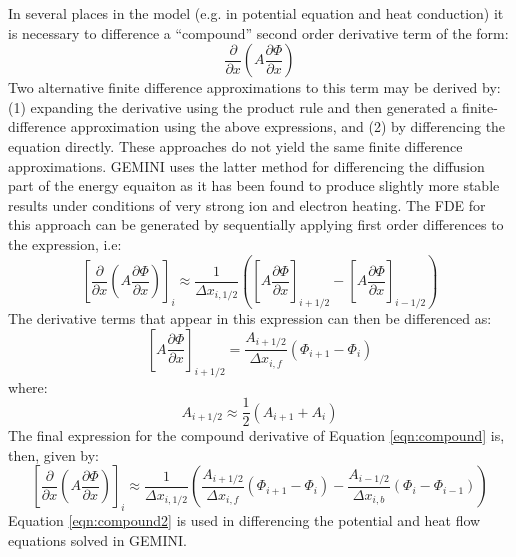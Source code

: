 \documentclass[11pt,letterpaper]{article}
\begin{document}
In several places in the model (e.g. in potential equation and heat conduction) it is necessary to difference a ``compound'' second order derivative term of the form:
\begin{equation}
\frac{\partial}{\partial x} \left( A \frac{\partial \Phi}{\partial x} \right) \label{eqn:compound}
\end{equation}
Two alternative finite difference approximations to this term may be derived by:  (1) expanding the derivative using the product rule and then generated a finite-difference approximation using the above expressions, and (2) by differencing the equation directly.  These approaches do not yield the same finite difference approximations.  GEMINI uses the latter method for differencing the diffusion part of the energy equaiton as it has been found to produce slightly more stable results under conditions of very strong ion and electron heating.  The FDE for this approach can be generated by sequentially applying first order differences to the expression, i.e:
\begin{equation}
\left[ \frac{\partial}{\partial x} \left( A \frac{\partial \Phi}{\partial x} \right) \right]_i \approx \frac{1}{\Delta x_{i,1/2}} \left( \left[ A \frac{\partial \Phi}{\partial x} \right]_{i+1/2} - \left[ A \frac{\partial \Phi}{\partial x} \right]_{i-1/2} \right)
\end{equation}
The derivative terms that appear in this expression can then be differenced as:
\begin{equation}
\left[ A \frac{\partial \Phi}{\partial x} \right]_{i+1/2} = \frac{A_{i+1/2}}{\Delta x_{i,f}} \left( \Phi_{i+1} - \Phi_{i} \right)
\end{equation}
where:
\begin{equation}
A_{i+1/2} \approx \frac{1}{2} \left( A_{i+1} + A_{i} \right)
\end{equation}
The final expression for the compound derivative of Equation \ref{eqn:compound} is, then, given by:
\begin{equation}
\left[ \frac{\partial}{\partial x} \left( A \frac{\partial \Phi}{\partial x} \right) \right]_i \approx \frac{1}{\Delta x_{i,1/2}} \left( \frac{A_{i+1/2}}{\Delta x_{i,f}} \left( \Phi_{i+1} - \Phi_{i} \right) - \frac{A_{i-1/2}}{\Delta x_{i,b}} \left( \Phi_{i} - \Phi_{i-1} \right) \right)
\label{eqn:compound2}
\end{equation}
Equation \ref{eqn:compound2} is used in differencing the potential and heat flow equations solved in GEMINI.
\end{document}
